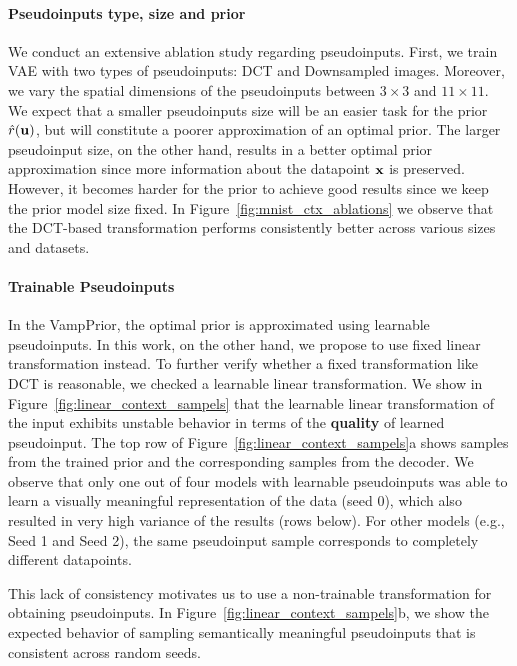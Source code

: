 \paragraph{Pseudoinputs type, size and prior}
We conduct an extensive ablation study regarding pseudoinputs. First, we train VAE with two types of pseudoinputs: DCT and Downsampled images. Moreover, we vary the spatial dimensions of the pseudoinputs between $3\times 3$ and $11\times 11$. We expect that a smaller pseudoinputs size will be an easier task for the prior $\hat{r}({\mathbf{u}})$, but will constitute a poorer approximation of an optimal prior. The larger pseudoinput size, on the other hand, results in a better optimal prior approximation since more information about the datapoint ${\mathbf{x}}$ is preserved. However, it becomes harder for the prior to achieve good results since we keep the prior model size fixed.
In Figure~\ref{fig:mnist_ctx_ablations} we observe that the DCT-based transformation performs consistently better across various sizes and datasets. 

\paragraph{Trainable Pseudoinputs}
In the VampPrior, the optimal prior is approximated using learnable pseudoinputs. In this work, on the other hand, we propose to use fixed linear transformation instead. To further verify whether a fixed transformation like DCT is reasonable, we checked a learnable linear transformation. We show in Figure~\ref{fig:linear_context_sampels} that the learnable linear transformation of the input exhibits unstable behavior in terms of the \textbf{quality} of learned pseudoinput. The top row of Figure~\ref{fig:linear_context_sampels}a shows samples from the trained prior and the corresponding samples from the decoder. 
We observe that only one out of four models with learnable pseudoinputs was able to learn a visually meaningful representation of the data (seed 0), which also resulted in very high variance of the results (rows below). For other models (e.g., Seed 1 and Seed 2), the same pseudoinput sample corresponds to completely different datapoints.

This lack of consistency motivates us to use a non-trainable transformation for obtaining pseudoinputs. In Figure~\ref{fig:linear_context_sampels}b, we show the expected behavior of sampling semantically meaningful pseudoinputs that is consistent across random seeds.


